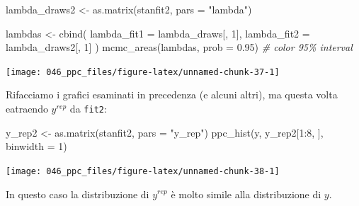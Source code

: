 \documentclass[
  11pt,
  italian,
  a4paper,
  extrafontsizes,onecolumn,openright
  ]{memoir}
\newenvironment{Shaded}{\begin{snugshade}}{\end{snugshade}}
\newcommand{\AttributeTok}[1]{\textcolor[rgb]{0.77,0.63,0.00}{#1}}
\newcommand{\CommentTok}[1]{\textcolor[rgb]{0.56,0.35,0.01}{\textit{#1}}}
\newcommand{\DecValTok}[1]{\textcolor[rgb]{0.00,0.00,0.81}{#1}}
\newcommand{\FloatTok}[1]{\textcolor[rgb]{0.00,0.00,0.81}{#1}}
\newcommand{\FunctionTok}[1]{\textcolor[rgb]{0.00,0.00,0.00}{#1}}
\newcommand{\NormalTok}[1]{#1}
\newcommand{\OtherTok}[1]{\textcolor[rgb]{0.56,0.35,0.01}{#1}}
\newcommand{\SpecialCharTok}[1]{\textcolor[rgb]{0.00,0.00,0.00}{#1}}
\newcommand{\StringTok}[1]{\textcolor[rgb]{0.31,0.60,0.02}{#1}}
\theoremstyle{definition}
\theoremstyle{definition}
\theoremstyle{definition}
\theoremstyle{definition}
\theoremstyle{remark}
\begin{document}
\begin{Shaded}
\end{Shaded}

\begin{Shaded}
\begin{Highlighting}[]
\NormalTok{lambda\_draws2 }\OtherTok{\textless{}{-}} \FunctionTok{as.matrix}\NormalTok{(stanfit2, }\AttributeTok{pars =} \StringTok{"lambda"}\NormalTok{)}

\NormalTok{lambdas }\OtherTok{\textless{}{-}} \FunctionTok{cbind}\NormalTok{(}
  \AttributeTok{lambda\_fit1 =}\NormalTok{ lambda\_draws[, }\DecValTok{1}\NormalTok{],}
  \AttributeTok{lambda\_fit2 =}\NormalTok{ lambda\_draws2[, }\DecValTok{1}\NormalTok{]}
\NormalTok{)}
\FunctionTok{mcmc\_areas}\NormalTok{(lambdas, }\AttributeTok{prob =} \FloatTok{0.95}\NormalTok{) }\CommentTok{\# color 95\% interval}
\end{Highlighting}
\end{Shaded}

\begin{center}\texttt{[image: 046\_ppc\_files/figure-latex/unnamed-chunk-37-1]} \end{center}

Rifacciamo i grafici esaminati in precedenza (e alcuni altri), ma questa volta eatraendo \(y^{rep}\) da \texttt{fit2}:

\begin{Shaded}
\begin{Highlighting}[]
\NormalTok{y\_rep2 }\OtherTok{\textless{}{-}} \FunctionTok{as.matrix}\NormalTok{(stanfit2, }\AttributeTok{pars =} \StringTok{"y\_rep"}\NormalTok{)}
\FunctionTok{ppc\_hist}\NormalTok{(y, y\_rep2[}\DecValTok{1}\SpecialCharTok{:}\DecValTok{8}\NormalTok{, ], }\AttributeTok{binwidth =} \DecValTok{1}\NormalTok{)}
\end{Highlighting}
\end{Shaded}

\begin{center}\texttt{[image: 046\_ppc\_files/figure-latex/unnamed-chunk-38-1]} \end{center}

\noindent
In questo caso la distribuzione di \(y^{rep}\) è molto simile alla distribuzione di \(y\).
\end{document}
